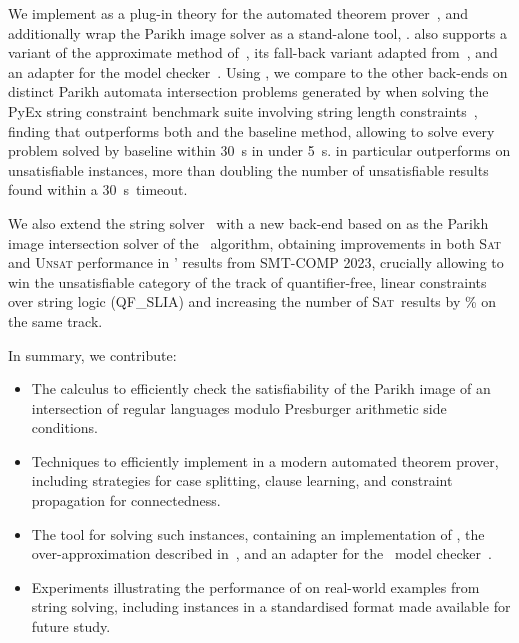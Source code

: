 We implement \Calculus{} as a plug-in theory for the \Princess{} automated
theorem prover~\cite{princess}, and additionally wrap the Parikh image solver as a stand-alone tool, \Catra{}.
\Catra{} also supports a variant of the approximate method of~\cite{approximate-parikh}, its fall-back variant adapted
from~\cite{generate-parikh-image}, and an adapter for the \Nuxmv{} model
checker~\cite{nuxmv}. Using \Catra, we compare \Calculus{} to the other 
back-ends on \NrBenchmarks{} distinct Parikh automata intersection problems
generated by \OstrichPlus{} when solving the PyEx string constraint benchmark
suite involving string length constraints~\cite{pyex}, finding that \Calculus{}
outperforms both \Nuxmv{} and the baseline method, allowing \Calculus{}
to solve every problem solved by baseline within \SI{30}{s} in under \SI{5}{s}.
\Calculus{} in particular outperforms \Nuxmv{} on unsatisfiable instances, more than 
doubling the number of unsatisfiable results found within a \SI{30}{s}~timeout.

We also extend the \Ostrich{} string solver~\cite{ostrich} with a new back-end
based on \Catra{} as the Parikh image intersection solver of
the \OstrichPlus{}~algorithm, obtaining improvements in both
\textsc{Sat} and \textsc{Unsat} performance in \Ostrich{}' results
from SMT-COMP 2023, crucially allowing \Ostrich{} to win the
unsatisfiable category of the track of quantifier-free, linear
constraints over string logic (QF\_SLIA) and increasing the number of
\textsc{Sat}~results by \% on the same track.



In summary, we contribute:
\begin{itemize}
\item The \Calculus{} calculus to efficiently check the satisfiability
  of the Parikh image of an intersection of regular languages modulo
  Presburger arithmetic side conditions.
    \item Techniques to efficiently implement \Calculus{} in a modern
    automated theorem prover, including strategies for case splitting, clause
    learning, and constraint propagation for connectedness.
    \item The \Catra{} tool for solving such instances, containing an
    implementation of \Calculus{}, the over-approximation described
    in~\cite{approximate-parikh}, and an adapter for the~\Nuxmv{} model
    checker~\cite{nuxmv}.
    \item Experiments illustrating the performance of \Calculus{} on real-world
    examples from string solving, including \NrBenchmarks{} instances in a
    standardised format made available for future study.
\end{itemize}

